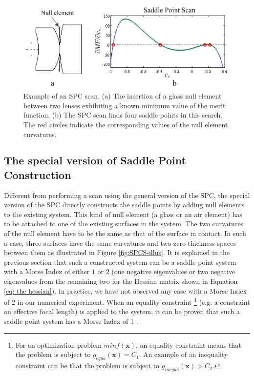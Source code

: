 \begin{figure}[h!]
    \centering
    \includegraphics[scale=0.8]{chapter-2/figures/SPCscan.png}
    \caption{Example of an SPC scan. (a) The insertion of a glass null element between two lenses exhibiting a known minimum value of the merit function. (b) The SPC scan finds four saddle points in this search. The red circles indicate the corresponding values of the null element curvatures.}
    \label{fig:SPCscan}
\end{figure}

\subsection{The special version of Saddle Point Construction}
\label{SPC_Special}
Different from performing a scan using the general version of the SPC, the special version of the SPC directly constructs the saddle points by adding null elements to the existing system. This kind of null element (a glass or an air element) has to be attached to one of the existing surfaces in the system. The two curvatures of the null element have to be the same as that of the surface in contact. In such a case, three surfaces have the same curvatures and two zero-thickness spaces between them as illustrated in Figure \ref{fig:SPCS-illus}. It is explained in the previous section that such a constructed system can be a saddle point system with a Morse Index of either $1$ or $2$ (one negative eigenvalues or two negative eigenvalues from the remaining two for the Hessian matrix shown in Equation \ref{eq: the hessian}). In practice, we have not observed any case with a Morse Index of $2$ in our numerical experiment. When an equality constraint \footnote{For an optimization problem $min f(\mathbf{x})$, an equality constraint means that the problem is subject to $g_{equa}(\mathbf{x})=C_1$. An example of an inequality constraint can be that the problem is subject to $g_{inequa}(\mathbf{x}) > C_2$.} (e.g. a constraint on effective focal length) is applied to the system, it can be proven that such a saddle point system has a Morse Index of $1$ \cite{BociortSPCSexplained}.

